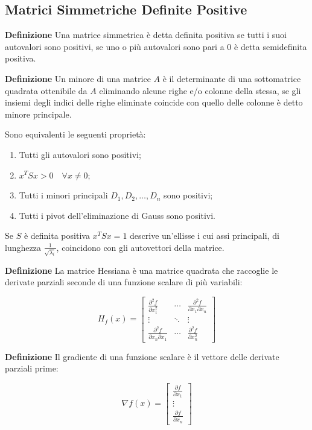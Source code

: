 \documentclass{article}
\newcommand{\df}{\noindent\textbf{Definizione} }
\begin{document}
\subsection{Matrici Simmetriche Definite Positive}

\df Una matrice simmetrica è detta definita positiva se tutti i suoi autovalori sono positivi, se uno o più autovalori sono pari a 0 è detta semidefinita positiva.\newline

\df Un minore di una matrice $A$ è il determinante di una sottomatrice quadrata ottenibile da 
$A$ eliminando alcune righe e/o colonne della stessa, se gli insiemi degli indici delle righe eliminate coincide con quello delle colonne è detto minore principale.\newline

Sono equivalenti le seguenti proprietà:

\begin{enumerate}
    \item Tutti gli autovalori sono positivi;
    \item $x^TSx>0\quad \forall x\neq0$;
    \item Tutti i minori principali $D_1,D_2,\ldots,D_n$
    sono positivi;
    \item Tutti i pivot dell'eliminazione di Gauss sono positivi.\newline
\end{enumerate}


Se $S$ è definita positiva $x^TSx=1$ descrive un'ellisse i cui assi principali, di lunghezza $\frac1{\sqrt{\lambda_i}}$, coincidono con gli autovettori della matrice.\newline

\df La matrice Hessiana è una matrice quadrata che raccoglie le derivate parziali seconde di una funzione scalare di più variabili:

\[
H_f(x)=
\begin{bmatrix}
\frac{\partial^2 f}{\partial x_1^2} &
\cdots &
\frac{\partial^2 f}{\partial x_1\partial x_n} \\
\vdots & \ddots & \vdots \\
\frac{\partial^2 f}{\partial x_n\partial x_1} &
\cdots &
\frac{\partial^2 f}{\partial x_n^2}
\end{bmatrix}
\]\newline

\df Il gradiente di una funzione scalare è il vettore delle derivate parziali prime:

\[
\nabla f(x)=
\begin{bmatrix}
\displaystyle \frac{\partial f}{\partial x_1} \\[0.4em]
\vdots \\
\displaystyle \frac{\partial f}{\partial x_n}
\end{bmatrix}
\]
\end{document}

